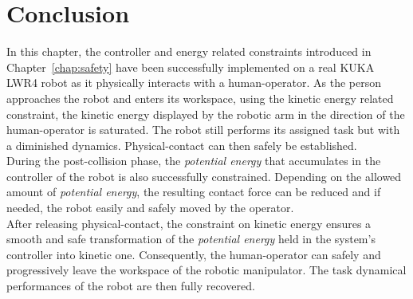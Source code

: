 % 
%

\section{Conclusion}
\label{sec:safety2conclusion}
In this chapter, the controller and energy related constraints introduced in Chapter~\ref{chap:safety} have been successfully implemented on a real KUKA LWR4 robot as it physically interacts with a human-operator. As the person approaches the robot and enters its workspace, using the kinetic energy related constraint, the kinetic energy displayed by the robotic arm in the direction of the human-operator is saturated. The robot still performs its assigned task but with a diminished dynamics. Physical-contact can then safely be established. \\
During the post-collision phase, the \textit{potential energy} that accumulates in the controller of the robot is also successfully constrained. Depending on the allowed amount of \textit{potential energy}, the resulting contact force can be reduced and if needed, the robot easily and safely moved by the operator. \\
After releasing physical-contact, the constraint on kinetic energy ensures a smooth and safe transformation of the \textit{potential energy} held in the system's controller into kinetic one. Consequently, the human-operator can safely and progressively leave the workspace of the robotic manipulator. The task dynamical performances of the robot are then fully recovered. 

